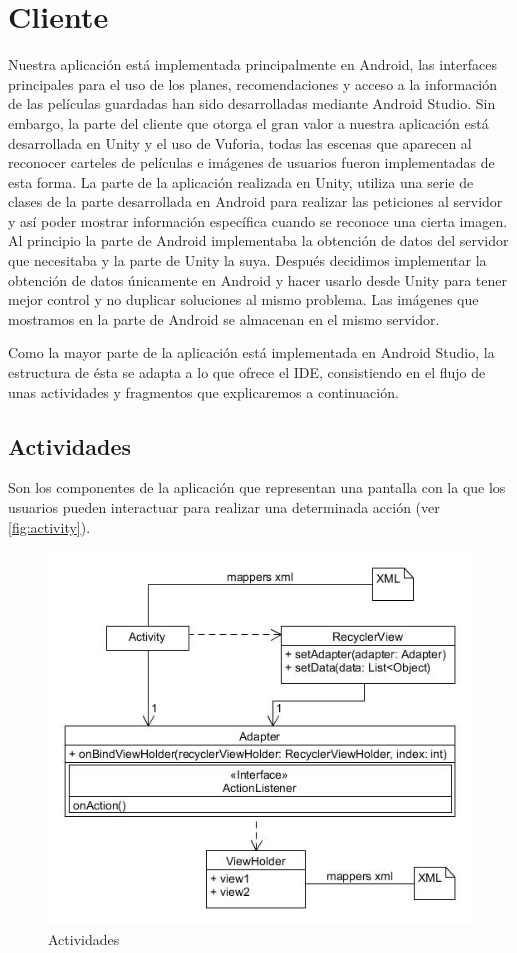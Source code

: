 \section{Cliente}
\label{makereference4.4}
Nuestra aplicación está implementada principalmente en Android, las interfaces principales para el uso de los planes, recomendaciones y acceso a la información de las películas guardadas han sido desarrolladas mediante Android Studio. Sin embargo,
la parte del cliente que otorga el gran valor a nuestra aplicación está desarrollada en Unity y el uso de Vuforia, todas las escenas que aparecen al reconocer carteles de películas e imágenes de usuarios fueron implementadas de esta forma.
La parte de la aplicación realizada en Unity, utiliza una serie de clases de la parte desarrollada en Android para realizar las peticiones al servidor y así poder mostrar información específica cuando se reconoce una cierta imagen.
Al principio la parte de Android implementaba la obtención de datos del servidor que necesitaba y la parte de Unity la suya. Después decidimos implementar la obtención de datos únicamente en Android y hacer usarlo desde Unity para tener mejor control y no duplicar soluciones al mismo problema.
Las imágenes que mostramos en la parte de Android se almacenan en el mismo servidor.


Como la mayor parte de la aplicación está implementada en Android Studio, la estructura de ésta se adapta a lo que ofrece el IDE, consistiendo en el flujo de unas actividades y fragmentos que explicaremos a continuación.


\subsection{Actividades}
\label{makereference4.4.1}
Son los componentes de la aplicación que representan una pantalla con la que
 los usuarios pueden interactuar para realizar una determinada
 acción (ver \autoref{fig:activity}).
\begin{figure}[H]
    \centering
    \includegraphics[width=6in]{figures/chapter-4/recyclerView.jpg}
    \caption{Actividades}
    \label{fig:activity}
\end{figure}


